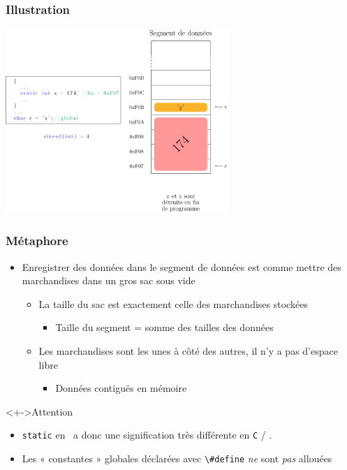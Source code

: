 \begin{frame}
\frametitle{Illustration}
\begin{center}
\includegraphics[height=7cm]{pics/static.pdf}
\end{center}
\end{frame}

\begin{frame}
\frametitle{Métaphore}
\begin{itemize}[<+->]
\item Enregistrer des données dans le segment de données est comme mettre des marchandises dans un gros sac sous vide
	\begin{itemize}
	\item La taille du sac est exactement celle des marchandises stockées
		\begin{itemize}
		\item Taille du segment = somme des tailles des données
		\end{itemize}
	\item Les marchandises sont les unes à côté des autres, il n'y a pas d'espace libre
		\begin{itemize}
		\item Données contiguës en mémoire
		\end{itemize}
	\end{itemize}
\end{itemize}
\begin{alertblock}<+->{Attention}
	\begin{itemize}[<+->]
	\item \lstinline|static| en \java\ a donc une signification très différente en \texttt{C} / \cpp.
	\item Les « constantes » globales déclarées avec \lstinline|\#define| \emph{ne} sont \emph{pas} allouées
	\end{itemize}
\end{alertblock}
\end{frame}

